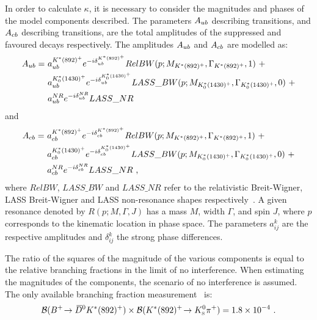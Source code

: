 In order to calculate $\kappa$, it is necessary to consider the magnitudes and phases of the model components described. The parameters $A_{{u}{b}}$ describing \decay{\bquark}{\uquark} transitions, and $A_{{c}{b}}$ describing \decay{\bquark}{\cquark} transitions, are the total amplitudes of the suppressed and favoured  decays respectively. The amplitudes $A_{{u}{b}}$ and $A_{{c}{b}}$ are modelled as:
\begin{align*}
A_{\uquark\bquark} =\ & a_{\uquark\bquark}^{K^*(892)^+}e^{-i\delta_{\uquark\bquark}^{K^*(892)^+}}RelBW(p;M_{K^*(892)^+},\Gamma_{K^*(892)^+},1)\ + \\
& a_{\uquark\bquark}^{K^*_0(1430)^+}e^{-i\delta_{\uquark\bquark}^{K^*_0(1430)^+}}LASS\_BW(p;M_{K^*_0(1430)^+},\Gamma_{K^*_0(1430)^+},0)\ + \\
& a_{\uquark\bquark}^{NR}e^{-i\delta_{\uquark\bquark}^{NR}}LASS\_NR
\end{align*}
and
\begin{align*}
A_{\cquark\bquark} =\ & a_{\cquark\bquark}^{K^*(892)^+}e^{-i\delta_{\cquark\bquark}^{K^*(892)^+}}RelBW(p;M_{K^*(892)^+},\Gamma_{K^*(892)^+},1)\ + \\
& a_{\cquark\bquark}^{K^*_0(1430)^+}e^{-i\delta_{\cquark\bquark}^{K^*_0(1430)^+}}LASS\_BW(p;M_{K^*_0(1430)^+},\Gamma_{K^*_0(1430)^+},0)\ + \\
& a_{\cquark\bquark}^{NR}e^{-i\delta_{\cquark\bquark}^{NR}}LASS\_NR \text{ ,}
\end{align*}
where $RelBW$, $LASS\_BW$ and $LASS\_NR$ refer to the relativistic Breit-Wigner, LASS Breit-Wigner and LASS non-resonance shapes respectively~\cite{LASS}. A given resonance denoted by $R(p;M,\Gamma,J)$ has a mass $M$, width $\Gamma$, and spin $J$, where $p$ corresponds to the kinematic location in \decay{\Bm}{\D\KS\pim} phase space. The parameters $a_{ij}^k$ are the respective amplitudes and $\delta_{ij}^k$ the strong phase differences.

The ratio of the squares of the magnitude of the various components is equal to the relative branching fractions in the limit of no interference. When estimating the magnitudes of the components, the scenario of no interference is assumed. The only available branching fraction measurement~\cite{PDG2016} is:
\begin{equation*}
{\ensuremath{\mathcal{B}}}({{{B}^+}}\!\rightarrow {\ensuremath{{\kern 0.2em\overline{\kern -0.2em D}{}}{}^0}} K^*(892)^+) \times {\ensuremath{\mathcal{B}}}(K^*(892)^+\!\rightarrow {\ensuremath{{K}^0_{\mathrm{ \scriptscriptstyle S}}}}{\ensuremath{{\pi}^+}}) = 1.8 \times 10^{-4} \text{ .}
\end{equation*}

